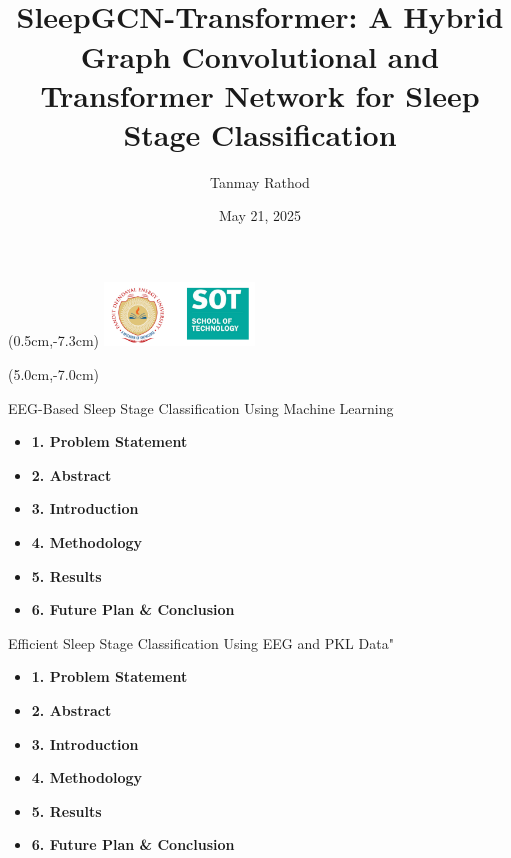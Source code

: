\documentclass [aspectratio=169]{beamer}
\title[]{\vspace{60pt} \\
SleepGCN-Transformer: A Hybrid Graph Convolutional and Transformer Network for Sleep Stage Classification} %
\author[]{Tanmay Rathod }
\date{May 21, 2025}
\begin{document}
{
\begin{frame}
    \titlepage
    \begin{textblock*}{4cm}(0.5cm,-7.3cm)
        \includegraphics[width=4cm]{pdpu logo-.png}
    \end{textblock*}
    \begin{textblock*}{8cm}(5.0cm,-7.0cm)
        \huge {} %
    \end{textblock*}
\end{frame}
}





\begin{frame}{EEG-Based Sleep Stage Classification Using Machine Learning}
	
	\begin{block}{}
		\begin{itemize}
			\item \textbf{1. Problem Statement}
			\item \textbf{2. Abstract}
			\item \textbf{3. Introduction}
			\item \textbf{4. Methodology}
			\item \textbf{5. Results}
			\item \textbf{6. Future Plan \& Conclusion}
		\end{itemize}
	\end{block}
\end{frame}












\begin{frame}{Efficient Sleep Stage Classification Using EEG and PKL Data"}
	
	\begin{block}{}
		\begin{itemize}
			\item \textbf{1. Problem Statement}
			\item \textbf{2. Abstract}
			\item \textbf{3. Introduction}
			\item \textbf{4. Methodology}
			\item \textbf{5. Results}
			\item \textbf{6. Future Plan \& Conclusion}
		\end{itemize}
	\end{block}
\end{frame}
\end{document}

